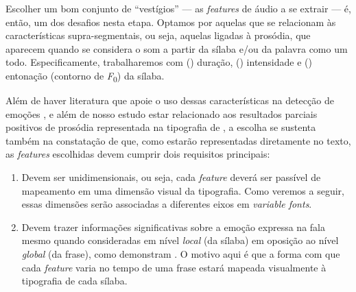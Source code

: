 \documentclass[a4paper,11pt,titlepage,singlespacing]{article}
\newcommand{\num}[1]{(\oldstylenums{#1})}
\newcommand\todo[1]{\textcolor{red}{#1}}
\begin{document}

Escolher um bom conjunto de ``vestígios'' — as \textit{features} de áudio a se extrair — é, então, um dos desafios nesta etapa. Optamos por aquelas que se relacionam às características supra-segmentais, ou seja, aquelas ligadas à prosódia, que aparecem quando se considera o som a partir da sílaba e/ou da palavra como um todo. Especificamente, trabalharemos com \num{1} duração, \num{2} intensidade e \num{3} entonação (contorno de \textit{F}\textsubscript{0}) da sílaba.

Além de haver literatura que apoie o uso dessas características na detecção de emoções \cite{koolagudi2012}, e além de nosso estudo estar relacionado aos resultados parciais positivos de prosódia representada na tipografia de , a escolha se sustenta também na constatação de que, como estarão representadas diretamente no texto, as \textit{features} escolhidas devem cumprir dois requisitos principais:

\begin{enumerate}[leftmargin=!,labelindent=-2.4em,itemindent=0pt]
  \item Devem ser unidimensionais, ou seja, cada \textit{feature} deverá ser passível de mapeamento em uma dimensão visual da tipografia. Como veremos a seguir, essas dimensões serão associadas a diferentes eixos em \textit{variable fonts}.
  
  \item Devem trazer informações significativas sobre a emoção expressa na fala mesmo quando consideradas em nível \textit{local} (da sílaba) em oposição ao nível \textit{global} (da frase), como demonstram . O motivo aqui é que a forma com que cada \textit{feature} varia no tempo de uma frase estará mapeada visualmente à tipografia de cada sílaba.
\end{enumerate}



\end{document}
